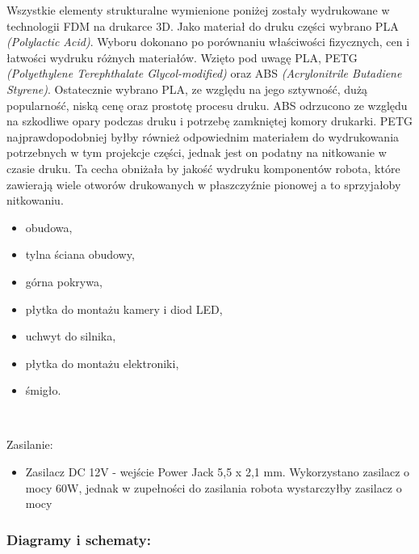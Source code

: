 Wszystkie elementy strukturalne wymienione poniżej zostały wydrukowane w technologii FDM na drukarce 3D. Jako materiał do druku części wybrano
PLA \textit{(Polylactic Acid)}. Wyboru dokonano po porównaniu właściwości fizycznych, cen i łatwości wydruku różnych materiałów. Wzięto pod uwagę
PLA, PETG \textit{(Polyethylene Terephthalate Glycol-modified)} oraz ABS \textit{(Acrylonitrile Butadiene Styrene)}. Ostatecznie wybrano PLA, ze względu na jego sztywność, dużą popularność,
niską cenę oraz prostotę procesu druku. ABS odrzucono ze względu na szkodliwe opary podczas druku i potrzebę zamkniętej komory drukarki. PETG najprawdopodobniej
byłby również odpowiednim materiałem do wydrukowania potrzebnych w tym projekcje części, jednak jest on podatny na nitkowanie w czasie druku. Ta cecha
obniżała by jakość wydruku komponentów robota, które zawierają wiele otworów drukowanych w płaszczyźnie pionowej a to sprzyjałoby nitkowaniu. \cite{PLA} \cite{PETG} \cite{ABS} \cite{PLA2}
    \begin{itemize}
        \item obudowa,
        \item tylna ściana obudowy,
        \item górna pokrywa,
        \item płytka do montażu kamery i diod LED,
        \item uchwyt do silnika,
        \item płytka do montażu elektroniki,
        \item śmigło.
    \end{itemize}\

Zasilanie:
\begin{itemize}
    \item Zasilacz DC 12V - wejście Power Jack 5,5 x 2,1 mm. Wykorzystano zasilacz o mocy 60W, jednak w zupełności do zasilania robota wystarczyłby zasilacz o mocy 
\end{itemize}


\subsubsection{Diagramy i schematy:}


